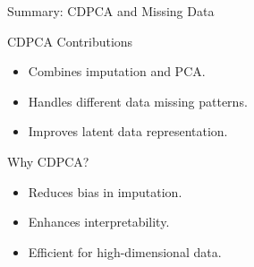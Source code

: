 \documentclass{beamer}
\begin{document}
\begin{frame}{Summary: CDPCA and Missing Data}
   \begin{block}{CDPCA Contributions}
       \begin{itemize}
           \item Combines imputation and PCA.
           \item Handles different data missing patterns.
           \item Improves latent data representation.
       \end{itemize}
   \end{block}

   \begin{block}{Why CDPCA?}
       \begin{itemize}
           \item Reduces bias in imputation.
           \item Enhances interpretability.
           \item Efficient for high-dimensional data.
       \end{itemize}
   \end{block}
\end{frame}
\end{document}
